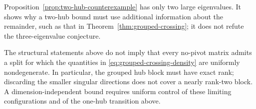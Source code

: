 Proposition~\ref{prop:two-hub-counterexample} has only two
large eigenvalues.  It shows why a two-hub bound must use
additional information about the remainder, such as that
in Theorem~\ref{thm:grouped-crossing}; it does not refute
the three-eigenvalue conjecture.

The structural statements above do not imply that every
no-pivot matrix admits a split for which the quantities in
\eqref{eq:grouped-crossing-density} are uniformly nondegenerate.
In particular, the grouped hub block must have exact rank;
discarding the smaller singular directions does not cover a
nearly rank-two block.  A dimension-independent bound requires
uniform control of these limiting configurations and of the
one-hub transition above.
